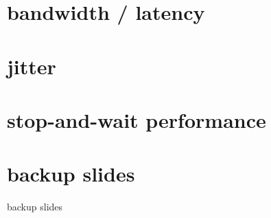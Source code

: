 \date{}
\title{}
\date{}
\usepackage{pgfplots}
\pgfplotsset{compat=1.16}

\begin{frame}
    \titlepage
\end{frame}



\section{bandwidth / latency}


\section{jitter}


\section{stop-and-wait performance}






\section{backup slides}
\begin{frame}{backup slides}
\end{frame}


